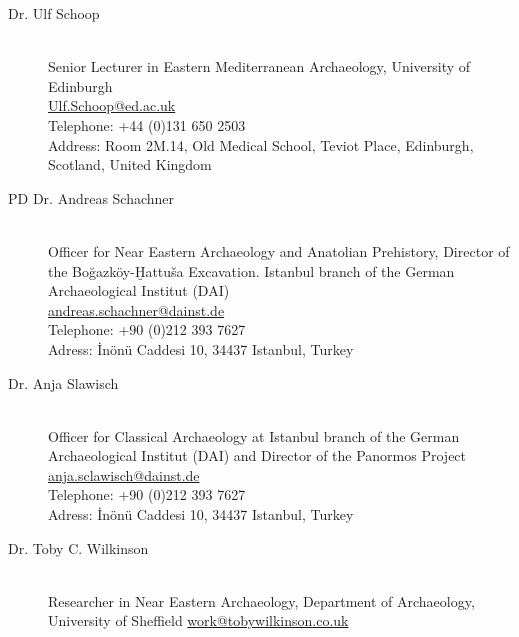 \begin{multicols}{2}
\begin{description}
  \item[Dr. Ulf Schoop] \hfill \\ Senior Lecturer in  Eastern Mediterranean Archaeology, 
   University of Edinburgh \\
  \href{mailto:Ulf.Schoop@ed.ac.uk}{Ulf.Schoop@ed.ac.uk}\\
  Telephone: +44 (0)131 650 2503 \\
  Address: Room 2M.14, Old Medical School, Teviot Place, Edinburgh, Scotland,
  United Kingdom 

  \item[PD Dr. Andreas Schachner] \hfill \\ Officer for Near Eastern Archaeology and
  Anatolian  Prehistory, Director of the Boğazköy-Ḫattuša Excavation.
  Istanbul branch of the German Archaeological Institut (DAI) \\
  \href{mailto:andreas.schachner@dainst.de}{andreas.schachner@dainst.de}\\ 
  Telephone: +90 (0)212 393 7627\\
  Adress: İnönü Caddesi 10,  34437 Istanbul, Turkey

  
  \item[Dr. Anja Slawisch] \hfill \\ Officer for Classical Archaeology at Istanbul
    branch of the German Archaeological
  Institut (DAI) and Director of the Panormos Project\\
  \href{mailto:anja.slawisch@dainst.de}{anja.sclawisch@dainst.de} \\
  Telephone: +90 (0)212 393 7627 \\
  Adress: İnönü Caddesi 10,  34437 Istanbul, Turkey
  
  \item[Dr. Toby C. Wilkinson] \hfill \\ Researcher in Near Eastern Archaeology, 
    Department of Archaeology, University of Sheffield
  \href{mailto:work@tobywilkinson.co.uk}{work@tobywilkinson.co.uk} \\

\end{description}

\end{multicols}
